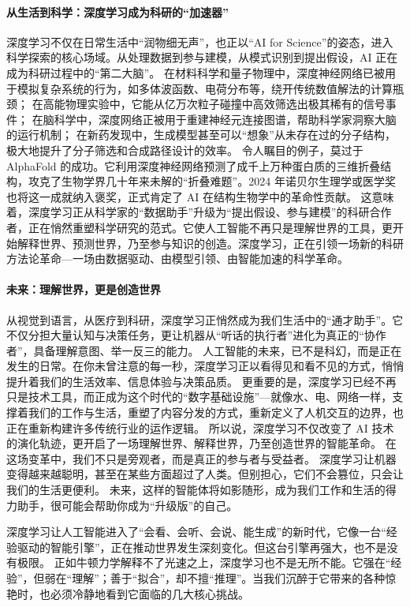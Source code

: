 \paragraph{从生活到科学：深度学习成为科研的“加速器”}
深度学习不仅在日常生活中“润物细无声”，也正以“AI for Science”的姿态，进入科学探索的核心场域。从处理数据到参与建模，从模式识别到提出假设，AI 正在成为科研过程中的“第二大脑”。
在材料科学和量子物理中，深度神经网络已被用于模拟复杂系统的行为，如多体波函数、电荷分布等，绕开传统数值解法的计算瓶颈；
在高能物理实验中，它能从亿万次粒子碰撞中高效筛选出极其稀有的信号事件；
在脑科学中，深度网络正被用于重建神经元连接图谱，帮助科学家洞察大脑的运行机制；
在新药发现中，生成模型甚至可以“想象”从未存在过的分子结构，极大地提升了分子筛选和合成路径设计的效率。
令人瞩目的例子，莫过于 AlphaFold 的成功。它利用深度神经网络预测了成千上万种蛋白质的三维折叠结构，攻克了生物学界几十年来未解的“折叠难题”。2024 年诺贝尔生理学或医学奖也将这一成就纳入褒奖，正式肯定了 AI 在结构生物学中的革命性贡献。
这意味着，深度学习正从科学家的“数据助手”升级为“提出假设、参与建模”的科研合作者，正在悄然重塑科学研究的范式。它使人工智能不再只是理解世界的工具，更开始解释世界、预测世界，乃至参与知识的创造。深度学习，正在引领一场新的科研方法论革命---一场由数据驱动、由模型引领、由智能加速的科学革命。
\paragraph{未来：理解世界，更是创造世界}
从视觉到语言，从医疗到科研，深度学习正悄然成为我们生活中的“通才助手”。它不仅分担大量认知与决策任务，更让机器从“听话的执行者”进化为真正的“协作者”，具备理解意图、举一反三的能力。
人工智能的未来，已不是科幻，而是正在发生的日常。在你未曾注意的每一秒，深度学习正以看得见和看不见的方式，悄悄提升着我们的生活效率、信息体验与决策品质。
更重要的是，深度学习已经不再只是技术工具，而正成为这个时代的“数字基础设施”---就像水、电、网络一样，支撑着我们的工作与生活，重塑了内容分发的方式，重新定义了人机交互的边界，也正在重新构建许多传统行业的运作逻辑。
所以说，深度学习不仅改变了 AI 技术的演化轨迹，更开启了一场理解世界、解释世界，乃至创造世界的智能革命。
在这场变革中，我们不只是旁观者，而是真正的参与者与受益者。
深度学习让机器变得越来越聪明，甚至在某些方面超过了人类。但别担心，它们不会篡位，只会让我们的生活更便利。
未来，这样的智能体将如影随形，成为我们工作和生活的得力助手，很可能会帮助你成为“升级版”的自己。

深度学习让人工智能进入了“会看、会听、会说、能生成”的新时代，它像一台“经验驱动的智能引擎”，正在推动世界发生深刻变化。但这台引擎再强大，也不是没有极限。
正如牛顿力学解释不了光速之上，深度学习也不是无所不能。它强在“经验”，但弱在“理解”；善于“拟合”，却不擅“推理”。当我们沉醉于它带来的各种惊艳时，也必须冷静地看到它面临的几大核心挑战。
